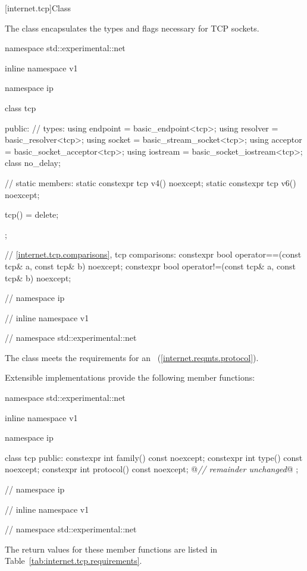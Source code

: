 %
[internet.tcp]{Class }

\pnum
The class  encapsulates the types and flags necessary for TCP sockets.

\begin{codeblock}
namespace std::experimental::net {
inline namespace v1 {
namespace ip {

  class tcp
  {
  public:
    // types:
    using endpoint = basic_endpoint<tcp>;
    using resolver = basic_resolver<tcp>;
    using socket = basic_stream_socket<tcp>;
    using acceptor = basic_socket_acceptor<tcp>;
    using iostream = basic_socket_iostream<tcp>;
    class no_delay;

    // static members:
    static constexpr tcp v4() noexcept;
    static constexpr tcp v6() noexcept;

    tcp() = delete;
  };

  // \ref{internet.tcp.comparisons}, tcp comparisons:
  constexpr bool operator==(const tcp& a, const tcp& b) noexcept;
  constexpr bool operator!=(const tcp& a, const tcp& b) noexcept;

} // namespace ip
} // inline namespace v1
} // namespace std::experimental::net
\end{codeblock}

\pnum
The  class meets the requirements for an ~(\ref{internet.reqmts.protocol}).

%
\pnum
 Extensible implementations provide the following member functions:

\begin{codeblock}
namespace std::experimental::net {
inline namespace v1 {
namespace ip {

  class tcp
  {
  public:
    constexpr int family() const noexcept;
    constexpr int type() const noexcept;
    constexpr int protocol() const noexcept;
    @\textit{// remainder unchanged}@
  };

} // namespace ip
} // inline namespace v1
} // namespace std::experimental::net
\end{codeblock}

\pnum
 The return values for these member functions are listed in Table~\ref{tab:internet.tcp.requirements}.

